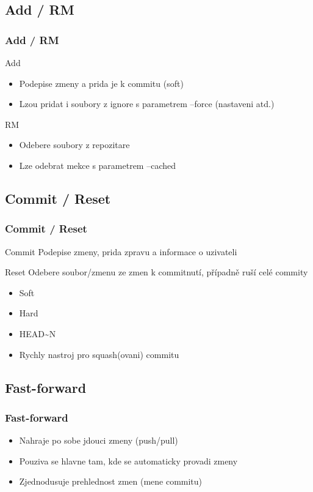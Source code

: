 \documentclass{beamer}
\begin{document}
\subsection{Add / RM}
\begin{frame}
 \frametitle{Add / RM}
  \begin{block}{Add}
   \begin{itemize}
    \item Podepise zmeny a prida je k commitu (soft)
    \item Lzou pridat i soubory z ignore s parametrem --force (nastaveni atd.)
   \end{itemize}
  \end{block}
   
  \begin{block}{RM} 
   \begin{itemize}
    \item Odebere soubory z repozitare
    \item Lze odebrat mekce s parametrem --cached
   \end{itemize}
  \end{block}
\end{frame}
 
\subsection{Commit / Reset}
\begin{frame}
 \frametitle{Commit / Reset}
  \begin{block}{Commit}
   Podepise zmeny, prida zpravu a informace o uzivateli
  \end{block}

  \begin{block}{Reset}
    Odebere soubor/zmenu ze zmen k commitnutí, případně ruší celé commity
    \begin{itemize}
      \item Soft
      \item Hard
      \item HEAD\textasciitilde{}N
      \item Rychly nastroj pro squash(ovani) commitu
    \end{itemize}
  \end{block}
\end{frame}

\subsection{Fast-forward}
\begin{frame}
 \frametitle{Fast-forward}
 \begin{itemize}
  \item Nahraje po sobe jdouci zmeny (push/pull)
  \item Pouziva se hlavne tam, kde se automaticky provadi zmeny
  \item Zjednodusuje prehlednost zmen (mene commitu)
 \end{itemize}
\end{frame}
\end{document}
